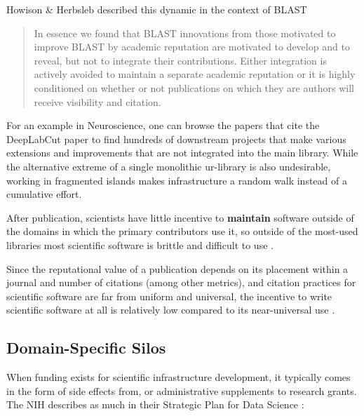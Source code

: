\documentclass[10pt]{tufte-book}
\begin{document}
Howison \& Herbsleb described this dynamic in the context of BLAST

\begin{quote}
In essence we found that BLAST innovations from those motivated to
improve BLAST by academic reputation are motivated to develop and to
reveal, but not to integrate their contributions. Either integration is
actively avoided to maintain a separate academic reputation or it is
highly conditioned on whether or not publications on which they are
authors will receive visibility and citation. \citep{howisonIncentivesIntegrationScientific2013} 
\end{quote}

For an example in Neuroscience, one can browse the papers that cite the
DeepLabCut paper \citep{mathisDeepLabCutMarkerlessPose2018a}  to
find hundreds of downstream projects that make various extensions and
improvements that are not integrated into the main library. While the
alternative extreme of a single monolithic ur-library is also
undesirable, working in fragmented islands makes infrastructure a random
walk instead of a cumulative effort.

After publication, scientists have little incentive to \textbf{maintain}
software outside of the domains in which the primary contributors use
it, so outside of the most-used libraries most scientific software is
brittle and difficult to use \citep{mangulImprovingUsabilityArchival2019, kumarBioinformaticsSoftwareBiologists2007} .

Since the reputational value of a publication depends on its placement
within a journal and number of citations (among other metrics), and
citation practices for scientific software are far from uniform and
universal, the incentive to write scientific software at all is
relatively low compared to its near-universal use \citep{howisonSoftwareScientificLiterature2016} .


\subsection{Domain-Specific Silos}

When funding exists for scientific infrastructure development, it
typically comes in the form of side effects from, or administrative
supplements to research grants. The NIH describes as much in their
Strategic Plan for Data Science \citep{NIHStrategicPlan2018} :
\end{document}
